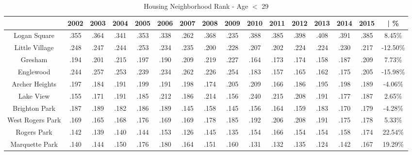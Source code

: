 \documentclass{article}
\theoremstyle{definition}
\theoremstyle{remark}
\begin{document}
\begin{table}[h]\centering
\caption{Housing Neighborhood Rank - Age $<$ 29}\label{thelabel}
\begin{adjustbox}{center}
\begin{tabular}{||c | c c c c c c c c c c c c c c | c ||} 
 \hline
 & 2002 & 2003 & 2004 & 2005 & 2006 & 2007 & 2008 & 2009 & 2010 & 2011 & 2012 & 2013 & 2014 & 2015 & | \%\\[0.5ex] 
 \hline\hline
Logan Square & .355 & .364 & .341 & .353 & .338 & .262 & .368 & .235 & .388 & .385 & .398 & .408 & .391 & .385 & 8.45\% \\
Little Village & .248 & .247 & .244 & .253 & .234 & .235 & .200 & .228 & .207 & .202 & .224 & .224 & .230 & .217 & -12.50\% \\
Gresham & .194 & .201 & .215 & .197 & .190 & .209 & .219 & .227 & .164 & .173 & .174 & .158 & .187 & .209 & 7.73\% \\
Englewood & .244 & .257 & .253 & .239 & .234 & .262 & .226 & .254 & .183 & .157 & .165 & .162 & .175 & .205 & -15.98\% \\
Archer Heights & .197 & .184 & .191 & .199 & .191 & .198 & .174 & .205 & .209 & .166 & .186 & .195 & .198 & .189 & -4.06\% \\
Lake View & .155 & .171 & .191 & .185 & .212 & .186 & .214 & .156 & .240 & .215 & .208 & .191 & .177 & .187 & 2.65\% \\
Brighton Park & .187 & .189 & .182 & .186 & .189 & .145 & .158 & .145 & .156 & .164 & .159 & .183 & .170 & .179 & -4.28\% \\
West Rogers Park & .169 & .165 & .168 & .176 & .169 & .169 & .178 & .185 & .192 & .206 & .208 & .191 & .175 & .178 & 5.33\% \\
Rogers Park & .142 & .139 & .140 & .144 & .153 & .126 & .145 & .135 & .154 & .166 & .154 & .154 & .158 & .174 & 22.54\% \\
Marquette Park & .140 & .144 & .150 & .176 & .180 & .164 & .151 & .160 & .131 & .132 & .135 & .124 & .142 & .167 & 19.29\% \\
 \hline
 \end{tabular}

\end{adjustbox}
 \end{table}
 
\end{document}

